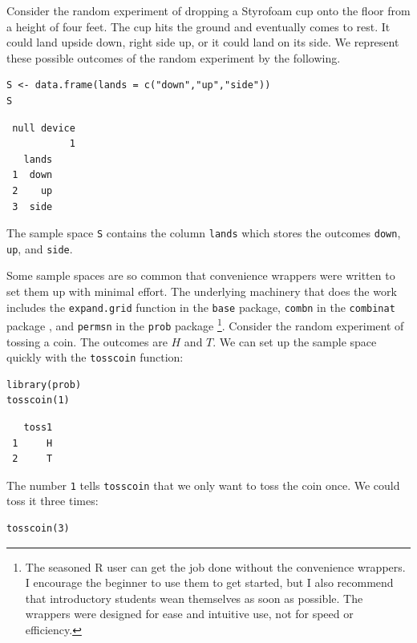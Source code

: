 \documentclass[captions=tableheading]{scrbook}
\begin{document}
\begin{example}
Consider the random experiment of dropping a Styrofoam cup onto the floor from a height of four feet. The cup hits the ground and eventually comes to rest. It could land upside down, right side up, or it could land on its side. We represent these possible outcomes of the random experiment by the following.


\begin{verbatim}
S <- data.frame(lands = c("down","up","side"))
S
\end{verbatim}

\begin{verbatim}
 null device 
           1
   lands
 1  down
 2    up
 3  side
\end{verbatim}


The sample space \texttt{S} contains the column \texttt{lands} which stores the outcomes \texttt{down}, \texttt{up}, and \texttt{side}. 

\end{example}

Some sample spaces are so common that convenience wrappers were written to set them up with minimal effort. The underlying machinery that does the work includes the \texttt{expand.grid} function in the \texttt{base} package, \texttt{combn} in the \texttt{combinat} package \cite{combinat}, and \texttt{permsn} in the \texttt{prob} package
\footnote{The seasoned \textsf{R} user can get the job done without the convenience wrappers. I encourage the beginner to use them to get started, but I also recommend that introductory students wean themselves as soon as possible. The wrappers were designed for ease and intuitive use, not for speed or efficiency.}.
Consider the random experiment of tossing a coin. The outcomes are \(H\) and \(T\). We can set up the sample space quickly with the \texttt{tosscoin} function:


\begin{verbatim}
library(prob)
tosscoin(1)
\end{verbatim}

\begin{verbatim}
   toss1
 1     H
 2     T
\end{verbatim}


The number \texttt{1} tells \texttt{tosscoin} that we only want to toss the coin once. We could toss it three times: 


\begin{verbatim}
tosscoin(3)
\end{verbatim}
\end{document}
